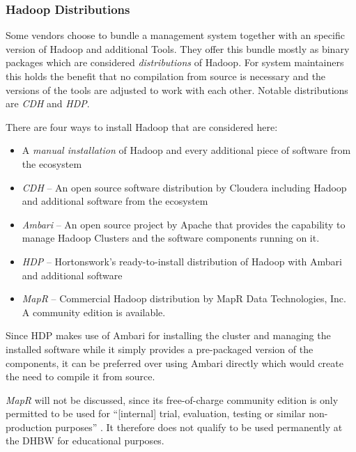 \subsubsection{Hadoop Distributions}
Some vendors choose to bundle a management system 
together with an specific version of Hadoop and additional Tools. They offer this bundle mostly as binary packages which are considered \emph{distributions} of Hadoop.
For system maintainers this holds the benefit that no compilation from source is necessary and the versions of the tools are adjusted to work with each other. 
Notable distributions are \emph{\acf{CDH}} and \emph{\acf{HDP}}. 

There are four ways to install Hadoop that are considered here:

\begin{itemize}
    \item A \emph{manual installation} of Hadoop 
        and every additional piece of software from the ecosystem
    \item \emph{\acf{CDH}} --  An open source software distribution by Cloudera including Hadoop
        and additional software from the ecosystem
    \item \emph{Ambari} -- An open source project by Apache that provides
        the capability to manage Hadoop Clusters and the software components running on it.
    \item \emph{\acf{HDP}} -- Hortonswork's ready-to-install distribution of Hadoop 
        with Ambari and additional software
    \item \emph{MapR} -- Commercial Hadoop distribution by MapR Data Technologies, Inc. A community edition is available. 
        
\end{itemize}

Since \ac{HDP} makes use of Ambari for installing the cluster and managing the installed software \autocite[][]{hortonworks2018ambari} while it simply provides a pre-packaged version of the components, 
it can be preferred over using Ambari directly which would create the need to compile it from source.

\emph{MapR} will not be discussed, since its free-of-charge community edition is only permitted to be used for \enquote{[internal] trial, evaluation, testing or similar non-production purposes} \autocite[][para.~1.5]{mapr2018EULA}. 
It therefore does not qualify to be used permanently at the \ac{DHBW} for educational purposes.

